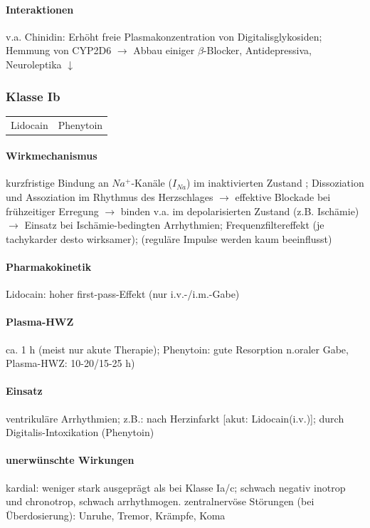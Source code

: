 \documentclass[10pt,a4paper]{report}
\begin{document}
\paragraph{Interaktionen} v.a. Chinidin: Erhöht freie Plasmakonzentration von Digitalisglykosiden; Hemmung von CYP2D6 $\rightarrow$ Abbau einiger $\beta$-Blocker, Antidepressiva, Neuroleptika $\downarrow$

\subsubsection{Klasse Ib}
\begin{tabularx}{\textwidth}{XX}
Lidocain&Phenytoin\\	 
\end{tabularx}

\paragraph{Wirkmechanismus} kurzfristige Bindung an $Na^+$-Kanäle ($I_{Na}$) im inaktivierten Zustand ; Dissoziation und Assoziation im Rhythmus des Herzschlages
	$\rightarrow$ 	effektive Blockade bei frühzeitiger Erregung
	$\rightarrow$ 	binden v.a. im depolarisierten Zustand (z.B. Ischämie) $\rightarrow$ Einsatz bei 	Ischämie-bedingten Arrhythmien; Frequenzfiltereffekt (je tachykarder desto wirksamer); (reguläre Impulse werden kaum beeinflusst)

\paragraph{Pharmakokinetik} Lidocain: hoher first-pass-Effekt (nur i.v.-/i.m.-Gabe)

\paragraph{Plasma-HWZ} ca. 1 h (meist nur akute Therapie); Phenytoin: gute Resorption n.oraler Gabe, Plasma-HWZ: 10-20/15-25 h)

\paragraph{Einsatz}	 ventrikuläre Arrhythmien; z.B.: nach Herzinfarkt [akut: Lidocain(i.v.)]; durch Digitalis-Intoxikation (Phenytoin)	

\paragraph{unerwünschte Wirkungen} kardial: weniger stark ausgeprägt als bei Klasse Ia/c; schwach negativ inotrop und chronotrop, schwach arrhythmogen. zentralnervöse Störungen (bei Überdosierung): Unruhe, Tremor, Krämpfe, Koma
\end{document}
